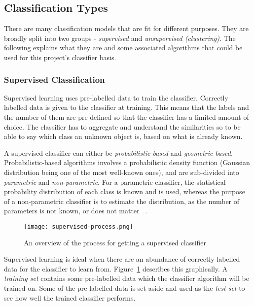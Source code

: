 \documentclass[lit_review.tex]{subfiles}
\begin{document}
\subsection{Classification Types}
There are many classification models that are fit for different purposes. They are broadly split into two groups - \textit{supervised} and \textit{unsupervised (clustering)}. The following explains what they are and some associated algorithms that could be used for this project's classifier basis.

\subsubsection{Supervised Classification}
Supervised learning uses pre-labelled data to train the classifier. Correctly labelled data is given to the classifier at training. This means that the labels and the number of them are pre-defined so that the classifier has a limited amount of choice. The classifier has to aggregate and understand the similarities so to be able to say which class an unknown object is, based on what is already known.~\cite{class-analysis} 

A supervised classifier can either be \textit{probabilistic-based} and \textit{geometric-based}. Probabilistic-based algorithms involves a probabilistic density function (Gaussian distribution being one of the most well-known ones), and are sub-divided into \textit{parametric} and \textit{non-parametric}. For a parametric classifier, the statistical probability distribution of each class is known and is used, whereas the purpose of a non-parametric classifier is to estimate the distribution, as the number of parameters is not known, or does not matter \cite{class-analysis}~\cite{hall-notes}.

\begin{figure}[h]
  \centering\texttt{[image: supervised-process.png]}
  \caption{An overview of the process for getting a supervised classifier~\cite{class-analysis}}
  \label{fig:supervised-process}
\end{figure}

Supervised learning is ideal when there are an abundance of correctly labelled data for the classifier to learn from. Figure~\ref{fig:supervised-process} describes this graphically. A \textit{training set} contains some pre-labelled data which the classifier algorithm will be trained on. Some of the pre-labelled data is set aside and used as the \textit{test set} to see how well the trained classifier performs. 
\end{document}
